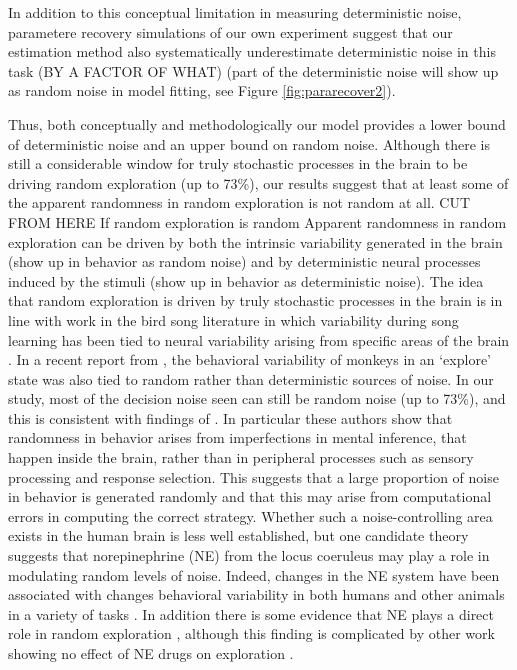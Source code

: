 \documentclass[12pt]{article}
\begin{document}
	In addition to this conceptual limitation in measuring deterministic noise, parametere recovery simulations of our own experiment  suggest that our estimation method also systematically underestimate deterministic noise in this task (BY A FACTOR OF WHAT) (part of the deterministic noise will show up as random noise in model fitting, see Figure \ref{fig:pararecover2}). 
	
	Thus, both conceptually and methodologically our model provides a lower bound of deterministic noise and an upper bound on random noise. Although there is still a considerable window for truly stochastic processes in the brain to be driving random exploration (up to 73\%), our results suggest that at least some of the apparent randomness in random exploration is not random at all. 
CUT FROM HERE
    If random exploration is random 
	Apparent randomness in random exploration can be driven by both the intrinsic variability generated in the brain (show up in behavior as random noise) and by deterministic neural processes induced by the stimuli (show up in behavior as deterministic noise).  The idea that random exploration is driven by truly stochastic processes in the brain is in line with work in the bird song literature in which variability during song learning has been tied to neural variability arising from specific areas of the brain \citep{songbird1, songbird2}. In a recent report from \cite{ebitz17}, the behavioral variability of monkeys in an `explore' state was also tied to random rather than deterministic sources of noise. In our study, most of the decision noise seen can still be random noise (up to 73\%), and this is consistent with findings of \cite{drugowitsch16}. In particular these authors show that randomness in behavior arises from imperfections in mental inference, that happen inside the brain, rather than in peripheral processes such as sensory processing and response selection. This suggests that a large proportion of noise in behavior is generated randomly and that this may arise from computational errors in computing the correct strategy. %
Whether such a noise-controlling area exists in the human brain is less well established, but one candidate theory \citep{aj2005} suggests that norepinephrine (NE) from the locus coeruleus may play a role in modulating random levels of noise. Indeed, changes in the NE system have been associated with changes behavioral variability in both humans and other animals in a variety of tasks \citep{eeKarpova14, eeKeung18}.  In addition there is some evidence that NE plays a direct role in random exploration \citep{eeWarren17}, although this finding is complicated by other work showing no effect of NE drugs on exploration \citep{jepma2012, nieuwenhuis05}. 
\end{document}

